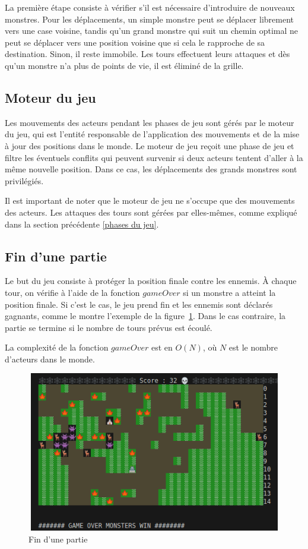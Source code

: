 \documentclass[11pt]{article}
\begin{document}
            La première étape consiste à vérifier s'il est nécessaire d'introduire de nouveaux monstres. Pour les déplacements, un simple monstre peut se déplacer librement vers une case voisine, tandis qu'un grand monstre qui suit un chemin optimal ne peut se déplacer vers une position voisine que si cela le rapproche de sa destination. Sinon, il reste immobile. Les tours effectuent leurs attaques et dès qu'un monstre n'a plus de points de vie, il est éliminé de la grille.
        \subsection{Moteur du jeu}
            Les mouvements des acteurs pendant les phases de jeu sont gérés par le moteur du jeu, qui est l'entité responsable de l'application des mouvements et de la mise à jour des positions dans le monde. Le moteur de jeu reçoit une phase de jeu et filtre les éventuels conflits qui peuvent survenir si deux acteurs tentent d'aller à la même nouvelle position. Dans ce cas, les déplacements des grands monstres sont privilégiés. 
            
            Il est important de noter que le moteur de jeu ne s'occupe que des mouvements des acteurs. Les attaques des tours sont gérées par elles-mêmes, comme expliqué dans la section précédente \ref{phases du jeu}.
        \subsection{Fin d'une partie}
        Le but du jeu consiste à protéger la position finale contre les ennemis. À chaque tour, on vérifie à l'aide de la fonction $gameOver$ si un monstre a atteint la position finale. Si c'est le cas, le jeu prend fin et les ennemis sont déclarés gagnants, comme le montre l'exemple de la figure~\ref{fig:fin d'une partie}. Dans le cas contraire, la partie se termine si le nombre de tours prévus est écoulé. 
        
        La complexité de la fonction $gameOver$ est en $O(N)$, où $N$ est le nombre d'acteurs dans le monde.
    \begin{figure}[h]
        \centering
        \includegraphics[height = 7cm, width = 12cm ]{Capture d’écran du 2023-05-12 14-11-17.png}
        \caption{Fin d'une partie}
        \label{fig:fin d'une partie}
    \end{figure}
        \newpage
\end{document}
